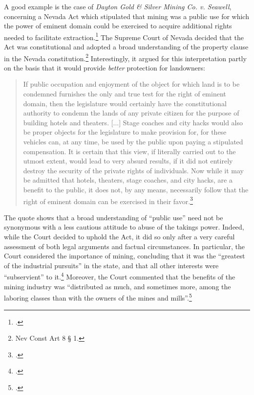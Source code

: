 \documentclass[12pt,a4paper]{book} %
\begin{document}
A good example is the case of {\it Dayton Gold \& Silver Mining Co. v. Seawell}, concerning a Nevada Act which stipulated that mining was a public use for which the power of eminent domain could be exercised to acquire additional rights needed to facilitate extraction.\footcite{seawell76} The Supreme Court of Nevada decided that the Act was constitutional and adopted a broad understanding of the property clause in the Nevada constitution.\footnote{Nev Const Art 8 § 1.} Interestingly, it argued for this interpretation partly on the basis that it would provide {\it better} protection for landowners:

\begin{quote}
If public occupation and enjoyment of the object for which land is to be condemned furnishes the only and true test for the right of eminent domain, then the legislature would certainly have the constitutional authority to condemn the lands of any private citizen for the purpose of building hotels and theaters. [...] Stage coaches and city hacks would also be proper objects for the legislature to make provision for, for these vehicles can, at any time, be used by the public upon paying a stipulated compensation. It is certain that this view, if literally carried out to the utmost extent, would lead to very absurd results, if it did not entirely destroy the security of the private rights of individuals. Now while it may be admitted that hotels, theaters, stage coaches, and city hacks, are a benefit to the public, it does not, by any means, necessarily follow that the right of eminent domain can be exercised in their favor.\footcite[410-411]{seawell76}
\end{quote}

The quote shows that a broad understanding of ``public use'' need not be synonymous with a less cautious attitude to abuse of the takings power. Indeed, while the Court decided to uphold the Act, it did so only after a very careful assessment of both legal arguments and factual circumstances. In particular, the Court considered the importance of mining, concluding that it was the ``greatest of the industrial pursuits'' in the state, and that all other interests were ``subservient'' to it.\footcite[409]{seawell76} Moreover, the Court commented that the benefits of the mining industry was ``distributed as much, and sometimes more, among the laboring classes than with the owners of the mines and mills''.\footcite[409]{seawell76}
\end{document}
